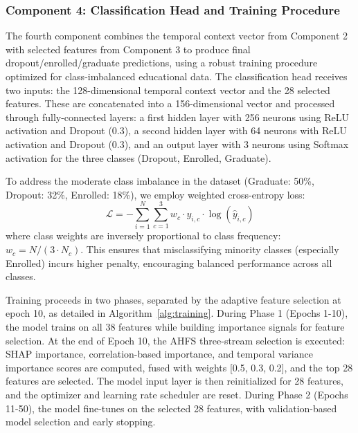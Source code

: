 \documentclass[journal]{IEEEtran}
\begin{document}
\subsubsection{Component 4: Classification Head and Training Procedure}

The fourth component combines the temporal context vector from Component 2 with selected features from Component 3 to produce final dropout/enrolled/graduate predictions, using a robust training procedure optimized for class-imbalanced educational data. The classification head receives two inputs: the 128-dimensional temporal context vector and the 28 selected features. These are concatenated into a 156-dimensional vector and processed through fully-connected layers: a first hidden layer with 256 neurons using ReLU activation and Dropout (0.3), a second hidden layer with 64 neurons with ReLU activation and Dropout (0.3), and an output layer with 3 neurons using Softmax activation for the three classes (Dropout, Enrolled, Graduate).

To address the moderate class imbalance in the dataset (Graduate: 50\%, Dropout: 32\%, Enrolled: 18\%), we employ weighted cross-entropy loss:
\begin{equation}
\mathcal{L} = -\sum_{i=1}^{N} \sum_{c=1}^{3} w_c \cdot y_{i,c} \cdot \log(\hat{y}_{i,c})
\end{equation}
where class weights are inversely proportional to class frequency: $w_c = N/(3 \cdot N_c)$. This ensures that misclassifying minority classes (especially Enrolled) incurs higher penalty, encouraging balanced performance across all classes.

Training proceeds in two phases, separated by the adaptive feature selection at epoch 10, as detailed in Algorithm~\ref{alg:training}. During Phase 1 (Epochs 1-10), the model trains on all 38 features while building importance signals for feature selection. At the end of Epoch 10, the AHFS three-stream selection is executed: SHAP importance, correlation-based importance, and temporal variance importance scores are computed, fused with weights [0.5, 0.3, 0.2], and the top 28 features are selected. The model input layer is then reinitialized for 28 features, and the optimizer and learning rate scheduler are reset. During Phase 2 (Epochs 11-50), the model fine-tunes on the selected 28 features, with validation-based model selection and early stopping.
\end{document}
